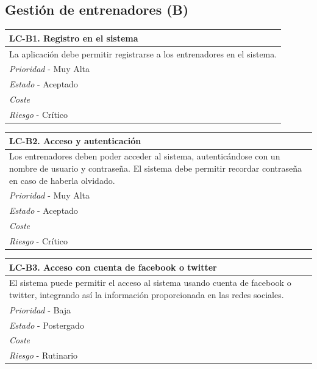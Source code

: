 
% 
%
\subsection{Gestión de entrenadores (B)} %
	\label{sub:gestion_de_entrenadores}
	
	\begin{center}
		\begin{tabularx}{15cm}{|X|}
			\hline 
				\bf{LC-B1. Registro en el sistema}\\
			\hline
				La aplicación debe permitir registrarse a los entrenadores en el sistema.\\
			\hline
				{\it Prioridad} - Muy Alta\\
			\hline
				{\it Estado} - Aceptado \\
			\hline
				{\it Coste}\\
			\hline
				{\it Riesgo} - Crítico\\
			\hline
		\end{tabularx}
	\end{center}
	
	\begin{center}
		\begin{tabularx}{15cm}{|X|}
			\hline 
				\bf{LC-B2. Acceso y autenticación}\\
			\hline
				Los entrenadores deben poder acceder al sistema, autenticándose con un nombre de usuario y contraseña. El sistema debe permitir recordar contraseña en caso de haberla olvidado.\\
			\hline
				{\it Prioridad} - Muy Alta\\
			\hline
				{\it Estado} - Aceptado\\
			\hline
				{\it Coste}\\
			\hline
				{\it Riesgo} - Crítico\\
			\hline
		\end{tabularx}
	\end{center}

	\begin{center}
		\begin{tabularx}{15cm}{|X|}
			\hline 
				\bf{LC-B3. Acceso con cuenta de facebook o twitter}\\
			\hline
				El sistema puede permitir el acceso al sistema usando cuenta de facebook o twitter, integrando así la información proporcionada en las redes sociales.\\
			\hline
				{\it Prioridad} - Baja\\
			\hline
				{\it Estado} - Postergado\\
			\hline
				{\it Coste}\\
			\hline
				{\it Riesgo} - Rutinario\\
			\hline
		\end{tabularx}
	\end{center}
	
